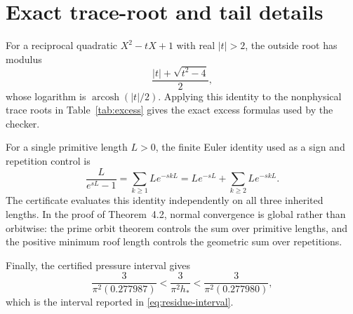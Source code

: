 \appendix
\section{Exact trace-root and tail details}

For a reciprocal quadratic \(X^2-tX+1\) with real \(|t|>2\), the outside
root has modulus
\[
\frac{|t|+\sqrt{t^2-4}}2,
\]
whose logarithm is \(\operatorname{arcosh}(|t|/2)\).  Applying this identity
to the nonphysical trace roots in Table~\ref{tab:excess} gives the exact
excess formulas used by the checker.

For a single primitive length \(L>0\), the finite Euler identity used as a
sign and repetition control is
\[
\frac{L}{e^{sL}-1}
=\sum_{k\ge1}Le^{-skL}
=Le^{-sL}+\sum_{k\ge2}Le^{-skL}.
\]
The certificate evaluates this identity independently on all three inherited
lengths.  In the proof of Theorem~4.2, normal convergence is global rather
than orbitwise: the prime orbit theorem controls the sum over primitive
lengths, and the positive minimum roof length controls the geometric sum over
repetitions.

Finally, the certified pressure interval gives
\[
\frac{3}{\pi^2(0.277987)}
<\frac3{\pi^2h_*}
<\frac{3}{\pi^2(0.277980)},
\]
which is the interval reported in \eqref{eq:residue-interval}.
